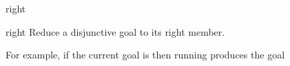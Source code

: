 \begin{tactic}{right}
  \begin{tsyntax}[empty]{right}
  Reduce a disjunctive goal to its right member.

  For example, if the current goal is
   then
  running 
  produces the goal
  \end{tsyntax}
\end{tactic}
